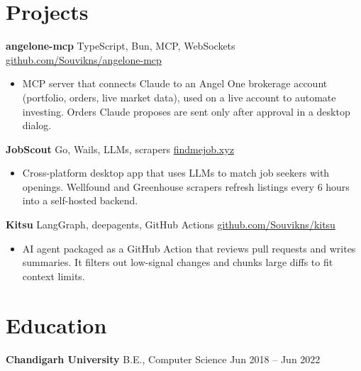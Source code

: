 \documentclass[10pt,a4paper]{article}
\newcommand{\project}[3]{%
  \textbf{#1} \textbar{} {\small #2} \hfill {\small #3}\par}
\begin{document}
\section{Projects}
\project{angelone-mcp}{TypeScript, Bun, MCP, WebSockets}{\href{https://github.com/Souvikns/angelone-mcp}{github.com/Souvikns/angelone-mcp}}
\begin{itemize}
  \item MCP server that connects Claude to an Angel One brokerage account (portfolio, orders, live market data), used on a live account to automate investing. Orders Claude proposes are sent only after approval in a desktop dialog.
\end{itemize}
\project{JobScout}{Go, Wails, LLMs, scrapers}{\href{https://findmejob.xyz}{findmejob.xyz}}
\begin{itemize}
  \item Cross-platform desktop app that uses LLMs to match job seekers with openings. Wellfound and Greenhouse scrapers refresh listings every 6 hours into a self-hosted backend.
\end{itemize}
\project{Kitsu}{LangGraph, deepagents, GitHub Actions}{\href{https://github.com/Souvikns/kitsu}{github.com/Souvikns/kitsu}}
\begin{itemize}
  \item AI agent packaged as a GitHub Action that reviews pull requests and writes summaries. It filters out low-signal changes and chunks large diffs to fit context limits.
\end{itemize}

\section{Education}
\textbf{Chandigarh University} \textbar{} B.E., Computer Science \hfill Jun 2018 -- Jun 2022
\end{document}
